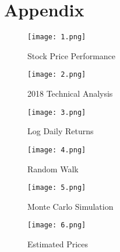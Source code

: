 \documentclass{article}
\begin{document}
\newpage
\section{Appendix}

\begin{figure}[htp]
\centering
\texttt{[image: 1.png]}
\caption{Stock Price Performance}
\end{figure}

\begin{figure}[htp]
\centering
\texttt{[image: 2.png]}
\caption{2018 Technical Analysis}
\end{figure}

\begin{figure}[htp]
\centering
\texttt{[image: 3.png]}
\caption{Log Daily Returns}
\end{figure}

\begin{figure}[htp]
\centering
\texttt{[image: 4.png]}
\caption{Random Walk}
\end{figure}

\begin{figure}[htp]
\centering
\texttt{[image: 5.png]}
\caption{Monte Carlo Simulation}
\end{figure}

\begin{figure}[htp]
\centering
\texttt{[image: 6.png]}
\caption{Estimated Prices}
\end{figure}
\end{document}
